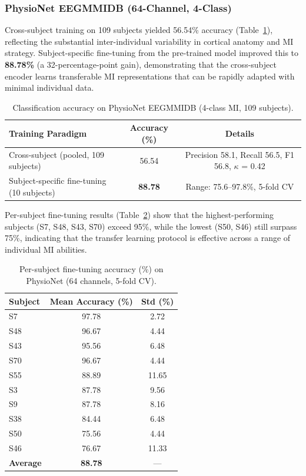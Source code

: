 \documentclass[12pt, a4paper]{article}
\begin{document}
\subsubsection{PhysioNet EEGMMIDB (64-Channel, 4-Class)}

Cross-subject training on 109 subjects yielded 56.54\% accuracy (Table~\ref{tab:physionet_results}), reflecting the substantial inter-individual variability in cortical anatomy and MI strategy. Subject-specific fine-tuning from the pre-trained model improved this to \textbf{88.78\%} (a 32-percentage-point gain), demonstrating that the cross-subject encoder learns transferable MI representations that can be rapidly adapted with minimal individual data.

\begin{table}[htbp]
\centering
\caption{Classification accuracy on PhysioNet EEGMMIDB (4-class MI, 109 subjects).}
\label{tab:physionet_results}
\begin{tabular}{lcc}
\toprule
\textbf{Training Paradigm} & \textbf{Accuracy (\%)} & \textbf{Details} \\
\midrule
Cross-subject (pooled, 109 subjects) & 56.54 & Precision 58.1, Recall 56.5, F1 56.8, $\kappa$ = 0.42 \\
Subject-specific fine-tuning (10 subjects) & \textbf{88.78} & Range: 75.6--97.8\%, 5-fold CV \\
\bottomrule
\end{tabular}
\end{table}

Per-subject fine-tuning results (Table~\ref{tab:finetune_detail}) show that the highest-performing subjects (S7, S48, S43, S70) exceed 95\%, while the lowest (S50, S46) still surpass 75\%, indicating that the transfer learning protocol is effective across a range of individual MI abilities.

\begin{table}[htbp]
\centering
\caption{Per-subject fine-tuning accuracy (\%) on PhysioNet (64 channels, 5-fold CV).}
\label{tab:finetune_detail}
\begin{tabular}{lcc}
\toprule
\textbf{Subject} & \textbf{Mean Accuracy (\%)} & \textbf{Std (\%)} \\
\midrule
S7  & 97.78 & 2.72 \\
S48 & 96.67 & 4.44 \\
S43 & 95.56 & 6.48 \\
S70 & 96.67 & 4.44 \\
S55 & 88.89 & 11.65 \\
S3  & 87.78 & 9.56 \\
S9  & 87.78 & 8.16 \\
S38 & 84.44 & 6.48 \\
S50 & 75.56 & 4.44 \\
S46 & 76.67 & 11.33 \\
\midrule
\textbf{Average} & \textbf{88.78} & --- \\
\bottomrule
\end{tabular}
\end{table}
\end{document}
